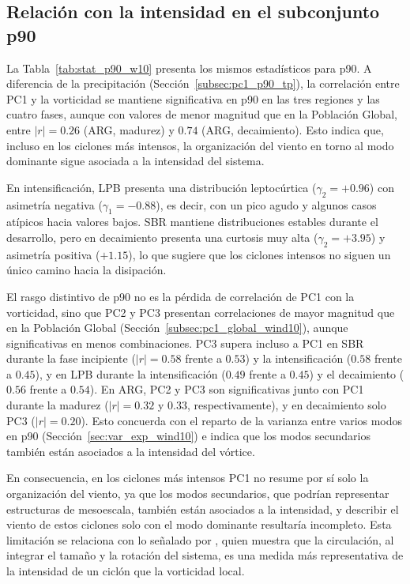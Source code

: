 \subsection{Relación con la intensidad en el subconjunto p90}\label{subsec:pc1_p90_wind10}

La Tabla~\ref{tab:stat_p90_w10} presenta los mismos estadísticos para p90. A diferencia de la precipitación (Sección~\ref{subsec:pc1_p90_tp}), la correlación entre PC1 y la vorticidad se mantiene significativa en p90 en las tres regiones y las cuatro fases, aunque con valores de menor magnitud que en la Población Global, entre $|r|=0.26$ (ARG, madurez) y $0.74$ (ARG, decaimiento). Esto indica que, incluso en los ciclones más intensos, la organización del viento en torno al modo dominante sigue asociada a la intensidad del sistema.

En intensificación, LPB presenta una distribución leptocúrtica ($\gamma_2 = +0.96$) con asimetría negativa ($\gamma_1 = -0.88$), es decir, con un pico agudo y algunos casos atípicos hacia valores bajos. SBR mantiene distribuciones estables durante el desarrollo, pero en decaimiento presenta una curtosis muy alta ($\gamma_2 = +3.95$) y asimetría positiva ($+1.15$), lo que sugiere que los ciclones intensos no siguen un único camino hacia la disipación.

El rasgo distintivo de p90 no es la pérdida de correlación de PC1 con la vorticidad, sino que PC2 y PC3 presentan correlaciones de mayor magnitud que en la Población Global (Sección~\ref{subsec:pc1_global_wind10}), aunque significativas en menos combinaciones. PC3 supera incluso a PC1 en SBR durante la fase incipiente ($|r|=0.58$ frente a $0.53$) y la intensificación ($0.58$ frente a $0.45$), y en LPB durante la intensificación ($0.49$ frente a $0.45$) y el decaimiento ($0.56$ frente a $0.54$). En ARG, PC2 y PC3 son significativas junto con PC1 durante la madurez ($|r|=0.32$ y $0.33$, respectivamente), y en decaimiento solo PC3 ($|r|=0.20$). Esto concuerda con el reparto de la varianza entre varios modos en p90 (Sección~\ref{sec:var_exp_wind10}) e indica que los modos secundarios también están asociados a la intensidad del vórtice.

En consecuencia, en los ciclones más intensos PC1 no resume por sí solo la organización del viento, ya que los modos secundarios, que podrían representar estructuras de mesoescala, también están asociados a la intensidad, y describir el viento de estos ciclones solo con el modo dominante resultaría incompleto. Esta limitación se relaciona con lo señalado por \citet{sinclair1997objective}, quien muestra que la circulación, al integrar el tamaño y la rotación del sistema, es una medida más representativa de la intensidad de un ciclón que la vorticidad local.

